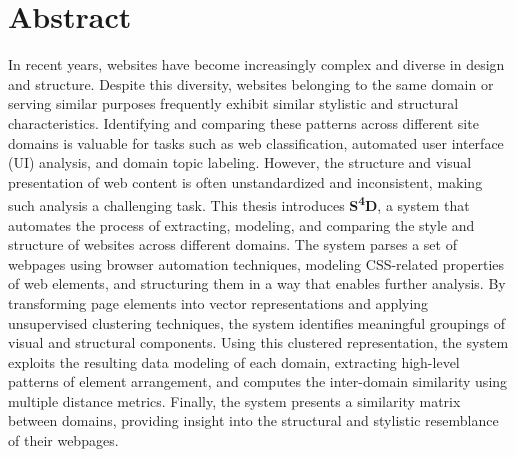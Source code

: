 \newpage
{}
\chapter*{Abstract}

In recent years, websites have become increasingly complex and diverse in design and structure. Despite this diversity, websites belonging to the same domain or serving similar purposes frequently exhibit similar stylistic and structural characteristics. Identifying and comparing these patterns across different site domains is valuable for tasks such as web classification, automated user interface (UI) analysis, and domain topic labeling. However, the structure and visual presentation of web content is often unstandardized and inconsistent, making such analysis a challenging task. This thesis introduces \textlatin{\textbf{S\textsuperscript{4}D}}, a system that automates the process of extracting, modeling, and comparing the style and structure of websites across different domains. The system parses a set of webpages using browser automation techniques, modeling CSS-related properties of web elements, and structuring them in a way that enables further analysis. By transforming page elements into vector representations and applying unsupervised clustering techniques, the system identifies meaningful groupings of visual and structural components. Using this clustered representation, the system exploits the resulting data modeling of each domain, extracting high-level patterns of element arrangement, and computes the inter-domain similarity using multiple distance metrics. Finally, the system presents a similarity matrix between domains, providing insight into the structural and stylistic resemblance of their webpages.

